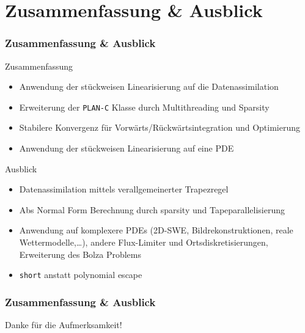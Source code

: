 \section[Problemstellung]{Zusammenfassung \& Ausblick}
\begin{frame}[<+->]
\frametitle{Zusammenfassung \& Ausblick}

\begin{block}{Zusammenfassung}
 \begin{itemize}
  \item Anwendung der stückweisen Linearisierung auf die Datenassimilation
  \item Erweiterung der \texttt{PLAN-C} Klasse durch Multithreading und Sparsity
  \item Stabilere Konvergenz für Vorwärts/Rückwärtsintegration und Optimierung
  \item Anwendung der stückweisen Linearisierung auf eine PDE
 \end{itemize}
\end{block}

\begin{block}{Ausblick}
 \begin{itemize}
  \item Datenassimilation mittels verallgemeinerter Trapezregel
  \item Abs Normal Form Berechnung durch sparsity und Tapeparallelisierung
  \item Anwendung auf komplexere PDEs (2D-SWE, Bildrekonstruktionen, reale Wettermodelle,\ldots ), andere Flux-Limiter und Ortsdiskretisierungen, Erweiterung des Bolza Problems
  \item \texttt{short} anstatt polynomial escape
 \end{itemize}

\end{block}

\end{frame}


\begin{frame}[<+->]
\frametitle{Zusammenfassung \& Ausblick}
\centering 
Danke für die Aufmerksamkeit!
\end{frame}


